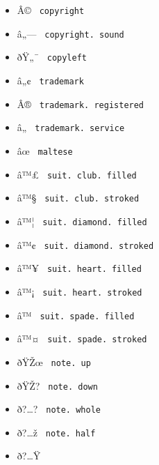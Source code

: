 \begin{itemize}
\item
  \label{symbol-copyright}{{ Â© } \texttt{\ copyright\ }}
\item
  \label{symbol-copyright.sound}{{ â„--- }
  \texttt{\ copyright.\ sound\ }}
\item
  \label{symbol-copyleft}{{ ðŸ„¯ } \texttt{\ copyleft\ }}
\item
  \label{symbol-trademark}{{ â„¢ }
  \texttt{\ trademark\ }}
\item
  \label{symbol-trademark.registered}{{ Â® }
  \texttt{\ trademark.\ registered\ }}
\item
  \label{symbol-trademark.service}{{ â„ }
  \texttt{\ trademark.\ service\ }}
\item
  \label{symbol-maltese}{{ âœ } \texttt{\ maltese\ }}
\item
  \label{symbol-suit.club.filled}{{ â™£ }
  \texttt{\ suit.\ club.\ filled\ }}
\item
  \label{symbol-suit.club.stroked}{{ â™§ }
  \texttt{\ suit.\ club.\ stroked\ }}
\item
  \label{symbol-suit.diamond.filled}{{ â™¦ }
  \texttt{\ suit.\ diamond.\ filled\ }}
\item
  \label{symbol-suit.diamond.stroked}{{ â™¢ }
  \texttt{\ suit.\ diamond.\ stroked\ }}
\item
  \label{symbol-suit.heart.filled}{{ â™¥ }
  \texttt{\ suit.\ heart.\ filled\ }}
\item
  \label{symbol-suit.heart.stroked}{{ â™¡ }
  \texttt{\ suit.\ heart.\ stroked\ }}
\item
  \label{symbol-suit.spade.filled}{{ â™ }
  \texttt{\ suit.\ spade.\ filled\ }}
\item
  \label{symbol-suit.spade.stroked}{{ â™¤ }
  \texttt{\ suit.\ spade.\ stroked\ }}
\item
  \label{symbol-note.up}{{ ðŸŽœ } \texttt{\ note.\ up\ }}
\item
  \label{symbol-note.down}{{ ðŸŽ? }
  \texttt{\ note.\ down\ }}
\item
  \label{symbol-note.whole}{{ ð?\ldots? }
  \texttt{\ note.\ whole\ }}
\item
  \label{symbol-note.half}{{ ð?\ldots ž }
  \texttt{\ note.\ half\ }}
\item
  \label{symbol-note.quarter}{{ ð?\ldots Ÿ }
}
\end{itemize}
